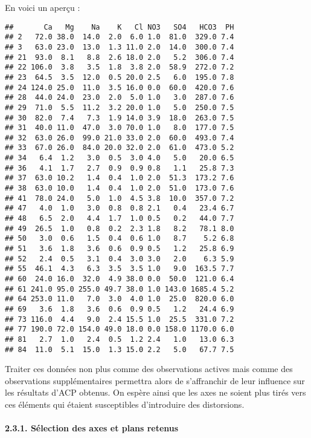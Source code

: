 \documentclass[]{article}
\let\oldparagraph\paragraph
\renewcommand{\paragraph}[1]{\oldparagraph{#1}\mbox{}}
\begin{document}
En voici un aperçu :

\begin{verbatim}
##       Ca   Mg    Na    K   Cl NO3   SO4   HCO3  PH
## 2   72.0 38.0  14.0  2.0  6.0 1.0  81.0  329.0 7.4
## 3   63.0 23.0  13.0  1.3 11.0 2.0  14.0  300.0 7.4
## 21  93.0  8.1   8.8  2.6 18.0 2.0   5.2  306.0 7.4
## 22 106.0  3.8   3.5  1.8  3.8 2.0  58.9  272.0 7.2
## 23  64.5  3.5  12.0  0.5 20.0 2.5   6.0  195.0 7.8
## 24 124.0 25.0  11.0  3.5 16.0 0.0  60.0  420.0 7.6
## 28  44.0 24.0  23.0  2.0  5.0 1.0   3.0  287.0 7.6
## 29  71.0  5.5  11.2  3.2 20.0 1.0   5.0  250.0 7.5
## 30  82.0  7.4   7.3  1.9 14.0 3.9  18.0  263.0 7.5
## 31  40.0 11.0  47.0  3.0 70.0 1.0   8.0  177.0 7.5
## 32  63.0 26.0  99.0 21.0 33.0 2.0  60.0  493.0 7.4
## 33  67.0 26.0  84.0 20.0 32.0 2.0  61.0  473.0 5.2
## 34   6.4  1.2   3.0  0.5  3.0 4.0   5.0   20.0 6.5
## 36   4.1  1.7   2.7  0.9  0.9 0.8   1.1   25.8 7.3
## 37  63.0 10.2   1.4  0.4  1.0 2.0  51.3  173.2 7.6
## 38  63.0 10.0   1.4  0.4  1.0 2.0  51.0  173.0 7.6
## 41  78.0 24.0   5.0  1.0  4.5 3.8  10.0  357.0 7.2
## 47   4.0  1.0   3.0  0.8  0.8 2.1   0.4   23.4 6.7
## 48   6.5  2.0   4.4  1.7  1.0 0.5   0.2   44.0 7.7
## 49  26.5  1.0   0.8  0.2  2.3 1.8   8.2   78.1 8.0
## 50   3.0  0.6   1.5  0.4  0.6 1.0   8.7    5.2 6.8
## 51   3.6  1.8   3.6  0.6  0.9 0.5   1.2   25.8 6.9
## 52   2.4  0.5   3.1  0.4  3.0 3.0   2.0    6.3 5.9
## 55  46.1  4.3   6.3  3.5  3.5 1.0   9.0  163.5 7.7
## 60  24.0 16.0  32.0  4.9 38.0 0.0  50.0  121.0 6.4
## 61 241.0 95.0 255.0 49.7 38.0 1.0 143.0 1685.4 5.2
## 64 253.0 11.0   7.0  3.0  4.0 1.0  25.0  820.0 6.0
## 69   3.6  1.8   3.6  0.6  0.9 0.5   1.2   24.4 6.9
## 73 116.0  4.4   9.0  2.4 15.5 1.0  25.5  331.0 7.2
## 77 190.0 72.0 154.0 49.0 18.0 0.0 158.0 1170.0 6.0
## 81   2.7  1.0   2.4  0.5  1.2 2.4   1.0   13.0 6.3
## 84  11.0  5.1  15.0  1.3 15.0 2.2   5.0   67.7 7.5
\end{verbatim}

Traiter ces données non plus comme des observations actives mais comme
des observations supplémentaires permettra alors de s'affranchir de leur
influence sur les résultats d'ACP obtenus. On espère ainsi que les axes
ne soient plus tirés vers ces éléments qui étaient susceptibles
d'introduire des distorsions.

\hypertarget{selection-des-axes-et-plans-retenus-2}{\paragraph{2.3.1.
Sélection des axes et plans
retenus}\label{selection-des-axes-et-plans-retenus-2}}
\end{document}
